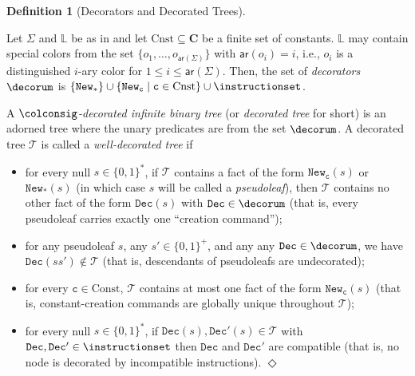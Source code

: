 \documentclass[10pt,a4paper]{amsart}
\theoremstyle{definition}
\numberwithin{equation}{section}
\theoremstyle{plain}
\theoremstyle{definition}
\newtheorem{definition}[definition]{Definition}
\theoremstyle{myexample}
\theoremstyle{plain}
\theoremstyle{definition}
\newcommand{\origcol}{o}
\newcommand{\cols}{\mathbb{L}}
\newcommand{\arity}[1]{\fcn{ar}(#1)}
\newcommand{\newconst}[1]{\pred{New}_{\const{#1}}} %
\newcommand{\newanon}{\pred{New}_{\const{*}}} %
\newcommand{\fcn}[1]{\mathsf{#1}}
\newcommand{\pred}[1]{\mathtt{#1}}
\newcommand{\const}[1]{\mathtt{#1}}
\newcommand{\defend}{\hfill\ensuremath{\Diamond}}
\begin{document}
\begin{definition}[Decorators and Decorated Trees]\label{def:well-dec}

	Let $\Sigma$ and $\cols$ be as in  and let $\mathrm{Cnst}\subseteq \mathbf{C}$ be a finite set of constants. $\cols$ may contain special colors from the set $\{\origcol_1, \ldots, \origcol_{\arity{\Sigma}}\}$ with $\arity{\origcol_i} = i$, i.e., $\origcol_i$ is a distinguished $i$-ary color for $1\le i\le \arity{\Sigma}$.
Then, the set of \emph{decorators} %
$\decorum$
is
$
\{ \newanon \} \cup \{ \newconst{c} \mid \const{c} \in \mathrm{Cnst}\} \cup \instructionset
$.

	A \emph{$\colconsig$-decorated infinite binary tree} (or \emph{decorated tree} for short) is an adorned tree where the unary predicates are from the set $\decorum$.  A decorated tree $\mathcal{T}$ is called a \emph{well-decorated tree} if 
	\begin{itemize}
		\item for every null $s\in\{ 0,1 \}^*$, if $\mathcal{T}$ contains a fact of the form $\newconst{c}(s)$ or $\newanon(s)$ (in which case $s$ will be called a \emph{pseudoleaf}), then $\mathcal{T}$ contains no other fact of the form $\pred{Dec}(s)$ with $\pred{Dec}\in\decorum$ (that is, every pseudoleaf carries exactly one ``creation command'');
		\item for any pseudoleaf $s$, any $s' \in \{0,1\}^+$, and any any $\pred{Dec}\in\decorum$, we have $\pred{Dec}(ss')\not\in \mathcal{T}$ (that is, descendants of pseudoleafs are undecorated);  
		\item for every $\const{c}\in\mathrm{Const}$, $\mathcal{T}$ contains at most one fact of the form $\newconst{c}(s)$ (that is, constant-creation commands are globally unique throughout $\mathcal{T}$);
        \item for every null $s\in\{ 0,1 \}^*$, if $\pred{Dec}(s),\pred{Dec'}(s) \in \mathcal{T}$ with $\pred{Dec},\pred{Dec'} \in \instructionset$ then $\pred{Dec}$ and $\pred{Dec'}$ are compatible (that is,  
        no node is decorated by incompatible instructions).
\defend
	\end{itemize}
\end{definition}
\end{document}
